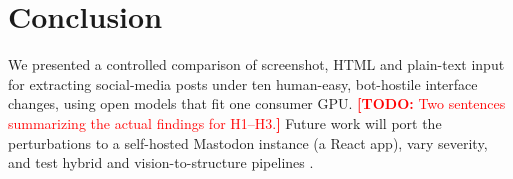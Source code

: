 \documentclass[letterpaper,10pt,twocolumn]{article}
\newcommand{\todo}[1]{\textcolor{red}{\textbf{[TODO:} #1\textbf{]}}}
\begin{document}
\section{Conclusion}

We presented a controlled comparison of screenshot, HTML and plain-text input
for extracting social-media posts under ten human-easy, bot-hostile interface
changes, using open models that fit one consumer GPU. \todo{Two sentences
summarizing the actual findings for H1--H3.} Future work will port the
perturbations to a self-hosted Mastodon instance (a React app), vary severity,
and test
hybrid and vision-to-structure pipelines \citep{lu2024omniparser}.



\end{document}
